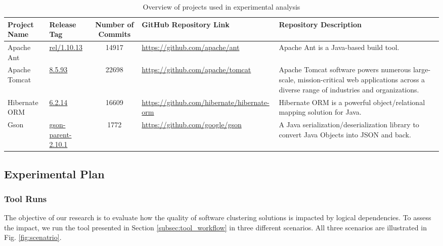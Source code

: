 \documentclass{ieeeaccess}
\begin{document}
\begin{table}
\centering
\caption{Overview of projects used in experimental analysis}
\label{tab:project_info}
\setlength{\tabcolsep}{7pt} 
\begin{tabular}{|l|l|c|l|p{4cm}|}
\hline
\textbf{Project Name} & \textbf{Release Tag} & \textbf{Number of Commits} & \textbf{GitHub Repository Link} & \textbf{Repository Description} \\ \hline
Apache Ant & \href{https://github.com/apache/ant/tree/rel/1.10.13}{rel/1.10.13} & 14917 & \href{https://github.com/apache/ant}{https://github.com/apache/ant} & Apache Ant is a Java-based build tool. \\ \hline
Apache Tomcat & \href{https://github.com/apache/tomcat/tree/8.5.93}{8.5.93} & 22698 & \href{https://github.com/apache/tomcat}{https://github.com/apache/tomcat} & Apache Tomcat software powers numerous large-scale, mission-critical web applications across a diverse range of industries and organizations. \\ \hline
Hibernate ORM & \href{https://github.com/hibernate/hibernate-orm/tree/6.2.14}{6.2.14} & 16609 & \href{https://github.com/hibernate/hibernate-orm}{https://github.com/hibernate/hibernate-orm} & Hibernate ORM is a powerful object/relational mapping solution for Java. \\ \hline
Gson & \href{https://github.com/google/gson/tree/gson-parent-2.10.1}{gson-parent-2.10.1} & 1772 & \href{https://github.com/google/gson}{https://github.com/google/gson} & A Java serialization/deserialization library to convert Java Objects into JSON and back. \\ \hline
\end{tabular}
\end{table}

\subsection{Experimental Plan}
\label{subsec:plan}

\subsubsection{Tool Runs}
The objective of our research is to evaluate how the quality of software clustering solutions is impacted by logical dependencies.
To assess the impact, we run the tool presented in Section \ref{subsec:tool_workflow} in three different scenarios. All three scenarios are illustrated in Fig. \ref{fig:scenatrio}.
\end{document}

